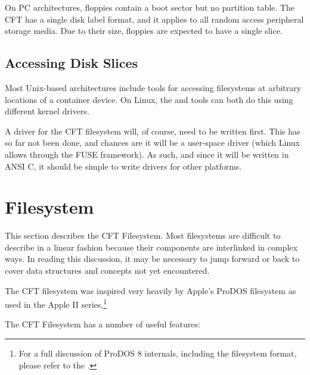 \noindent On PC architectures, floppies contain a boot sector but no
partition table. The CFT has a single disk label format, and it
applies to all random access peripheral storage media. Due to their
size, floppies are expected to have a single slice.

\subsection{Accessing Disk Slices}

Most Unix-based architectures include tools for accessing filesystems
at arbitrary locations of a container device. On Linux, the
 and  tools can both do this using
different kernel drivers.

A driver for the CFT filesystem will, of course, need to be written
first. This has so far not been done, and chances are it will be a
user-space driver (which Linux allows through the FUSE framework). As
such, and since it will be written in ANSI C, it should be simple to
write drivers for other platforms.

\section{Filesystem}
\label{sec:fs}

This section describes the CFT Filesystem. Most filesystems are difficult to
describe in a linear fashion because their components are interlinked in
complex ways. In reading this discussion, it may be necessary to jump forward
or back to cover data structures and concepts not yet encountered.

The CFT \gls{filesystem} was inspired very heavily by Apple's ProDOS filesystem
as used in the Apple II series.\footnote{For a full discussion of ProDOS 8
  internals, including the filesystem format, please refer to the
  .}

The CFT Filesystem has a number of useful features:

